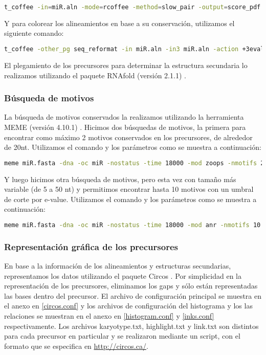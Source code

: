 \begin{lstlisting}[language=bash]
t_coffee -in=miR.aln -mode=rcoffee -method=slow_pair -output=score_pdf score_ascii -run_name=miR_R_Coffee
\end{lstlisting}

Y para colorear los alineamientos en base a su conservación, utilizamos el siguiente comando:

\begin{lstlisting}[language=bash]
t_coffee -other_pg seq_reformat -in miR.aln -in3 miR.aln -action +3evaluate idmat -out= miR.aln_R_Coffee.pdf
\end{lstlisting}

El plegamiento de los precursores para determinar la estructura secundaria lo realizamos utilizando el paquete RNAfold (versión 2.1.1) \citep{pmid22115189}.

\subsubsection{Búsqueda de motivos}
La búsqueda de motivos conservados la realizamos utilizando la herramienta MEME (versión 4.10.1) \citep{pmid7584402}.
Hicimos dos búsquedas de motivos, la primera para encontrar como máximo 2 motivos conservados en los precursores, de alrededor de 20nt.
Utilizamos el comando y los parámetros como se muestra a continuación:

\begin{lstlisting}[language=bash]
meme miR.fasta -dna -oc miR -nostatus -time 18000 -mod zoops -nmotifs 2 -minw 19 -maxw 23 -revcomp
\end{lstlisting}

Y luego hicimos otra búsqueda de motivos, pero esta vez con tamaño más variable (de 5 a 50 nt) y permitimos encontrar hasta 10 motivos con un umbral de corte por e-value.
Utilizamos el comando y los parámetros como se muestra a continuación:

\begin{lstlisting}[language=bash]
meme miR.fasta -dna -oc miR -nostatus -time 18000 -mod anr -nmotifs 10 -minw 5 -maxw 50 -revcomp -evt 1e-3
\end{lstlisting}

\subsubsection{Representación gráfica de los precursores}
En base a la información de los alineamientos y estructuras secundarias, representamos los datos utilizando el paquete Circos \citep{pmid19541911}.
Por simplicidad en la representación de los precursores, eliminamos los gaps y sólo están representadas las bases dentro del precursor. 
El archivo de configuración principal se muestra en el anexo en \ref{circos.conf} y los archivos de configuración del histograma y los las relaciones se muestran en el anexo en \ref{histogram.conf} y \ref{inks.conf} respectivamente. 
Los archivos karyotype.txt, highlight.txt y link.txt son distintos para cada precursor en particular y se realizaron mediante un script, con el formato que se especifica en \url{http://circos.ca/}.

